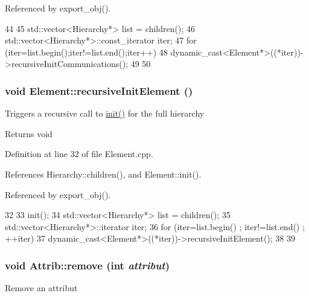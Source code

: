 Referenced by export\_\-obj().


\begin{DoxyCode}
44                                          {
45   std::vector<Hierarchy*> list = children();
46   std::vector<Hierarchy*>::const_iterator iter;
47   for (iter=list.begin();iter!=list.end();iter++){
48     dynamic_cast<Element*>((*iter))->recursiveInitCommunications();
49   }
50 }
\end{DoxyCode}
\hypertarget{classElement_a3c0abcb36f8906688bb7e32608df7086}{
\subsubsection[{recursiveInitElement}]{\setlength{\rightskip}{0pt plus 5cm}void Element::recursiveInitElement ()}}
\label{classElement_a3c0abcb36f8906688bb7e32608df7086}
Triggers a recursive call to \hyperlink{classElement_af42754b5cabc198869222725218d695c}{init()} for the full hierarchy

\begin{DoxyReturn}{Returns}
void 
\end{DoxyReturn}


Definition at line 32 of file Element.cpp.

References Hierarchy::children(), and Element::init().

Referenced by export\_\-obj().


\begin{DoxyCode}
32                                   {
33   init();
34   std::vector<Hierarchy*> list = children();
35   std::vector<Hierarchy*>::iterator iter;
36   for (iter=list.begin() ; iter!=list.end() ; ++iter){
37     dynamic_cast<Element*>((*iter))->recursiveInitElement();
38   }
39 }
\end{DoxyCode}
\hypertarget{classAttrib_a7d4ef7e32d93cb287792b87b857e79f3}{
\subsubsection[{remove}]{\setlength{\rightskip}{0pt plus 5cm}void Attrib::remove (int {\em attribut})}}
\label{classAttrib_a7d4ef7e32d93cb287792b87b857e79f3}
Remove an attribut 

